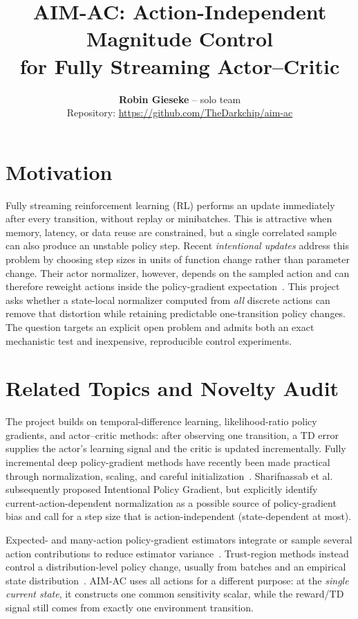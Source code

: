 \documentclass{article}
\title{AIM-AC: Action-Independent Magnitude Control\\for Fully Streaming Actor--Critic}
\author{\textbf{Robin Gieseke} -- solo team \\
Repository: \url{https://github.com/TheDarkchip/aim-ac}}
\begin{document}
\maketitle

\section{Motivation}
Fully streaming reinforcement learning (RL) performs an update immediately after every transition, without replay or minibatches. This is attractive when memory, latency, or data reuse are constrained, but a single correlated sample can also produce an unstable policy step. Recent \emph{intentional updates} address this problem by choosing step sizes in units of function change rather than parameter change. Their actor normalizer, however, depends on the sampled action and can therefore reweight actions inside the policy-gradient expectation~\citep{sharifnassab2026intentional}. This project asks whether a state-local normalizer computed from \emph{all} discrete actions can remove that distortion while retaining predictable one-transition policy changes. The question targets an explicit open problem and admits both an exact mechanistic test and inexpensive, reproducible control experiments.

\section{Related Topics and Novelty Audit}
The project builds on temporal-difference learning, likelihood-ratio policy gradients, and actor--critic methods: after observing one transition, a TD error supplies the actor's learning signal and the critic is updated incrementally. Fully incremental deep policy-gradient methods have recently been made practical through normalization, scaling, and careful initialization~\citep{vasan2024deep,elsayed2024streaming}. Sharifnassab et al.~\citep{sharifnassab2026intentional} subsequently proposed Intentional Policy Gradient, but explicitly identify current-action-dependent normalization as a possible source of policy-gradient bias and call for a step size that is action-independent (state-dependent at most).

Expected- and many-action policy-gradient estimators integrate or sample several action contributions to reduce estimator variance~\citep{ciosek2020expected,nauman2023manyactions}. Trust-region methods instead control a distribution-level policy change, usually from batches and an empirical state distribution~\citep{schulman2015trpo}. AIM-AC uses all actions for a different purpose: at the \emph{single current state}, it constructs one common sensitivity scalar, while the reward/TD signal still comes from exactly one environment transition.
\end{document}
